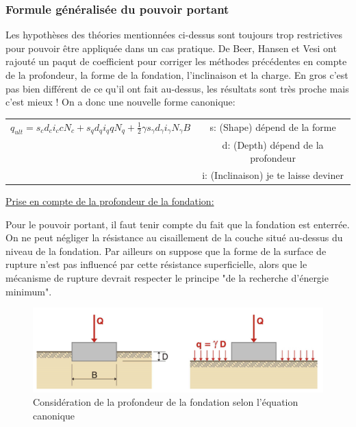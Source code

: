         \subsubsection{Formule généralisée du pouvoir portant}
        
            Les hypothèses des théories mentionnées ci-dessus sont toujours trop restrictives pour pouvoir être appliquée dans un cas pratique. De Beer, Hansen et Vesi ont rajouté un paqut de coefficient pour corriger les méthodes précédentes en compte de la profondeur, la forme de la fondation, l'inclinaison et la charge. En gros c'est pas bien différent de ce qu'il ont fait au-dessus, les résultats sont très proche mais c'est mieux ! On a donc une nouvelle forme canonique:
            
            \begin{center}
                \begin{tabular}{c|c}
                    $q_{ult} = s_c d_c i_c c N_c + s_q d_q i_q q N_q + \frac{1}{2} \gamma s_{\gamma} d_{\gamma} i_{\gamma} N_{\gamma} B$  
                        &   s: (Shape) dépend de la forme \\
                        &   d: (Depth) dépend de la profondeur \\
                        &   i: (Inclinaison) je te laisse deviner 
                \end{tabular}
            \end{center}
            
            \underline{Prise en compte de la profondeur de la fondation:} 
        
            Pour le pouvoir portant, il faut tenir compte du fait que la fondation est enterrée. On ne peut négliger la résistance au cisaillement de la couche situé au-dessus du niveau de la fondation. Par ailleurs on suppose que la forme de la surface de rupture n'est pas influencé par cette résistance superficielle, alors que le mécanisme de rupture devrait respecter le principe "de la recherche d'énergie minimum". 
            
            \begin{figure}[h!]
                \centering
                \includegraphics[scale=0.8]{Holeyman/images/H23.PNG}
                \caption{Considération de la profondeur de la fondation selon l’équation canonique }
            \end{figure}
            
